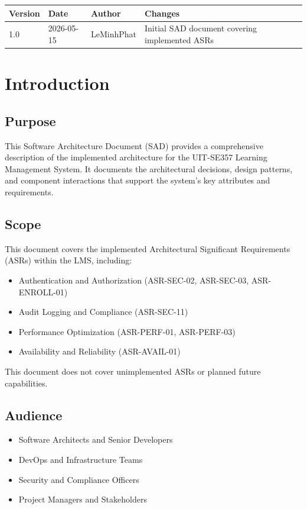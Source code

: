 \documentclass[12pt,oneside,a4paper]{article}
\begin{document}
\begin{tabularx}{\textwidth}{|p{1.5cm}|p{2cm}|p{3cm}|X|}
    \hline
    \textbf{Version} & \textbf{Date} & \textbf{Author} & \textbf{Changes} \\
    \hline
    1.0 & 2026-05-15 & LeMinhPhat & Initial SAD document covering implemented ASRs \\
    \hline
\end{tabularx}

\newpage

\tableofcontents
\newpage

\section{Introduction}

\subsection{Purpose}
This Software Architecture Document (SAD) provides a comprehensive description of the implemented architecture for the UIT-SE357 Learning Management System. It documents the architectural decisions, design patterns, and component interactions that support the system's key attributes and requirements.

\subsection{Scope}
This document covers the implemented Architectural Significant Requirements (ASRs) within the LMS, including:
\begin{itemize}
    \item Authentication and Authorization (ASR-SEC-02, ASR-SEC-03, ASR-ENROLL-01)
    \item Audit Logging and Compliance (ASR-SEC-11)
    \item Performance Optimization (ASR-PERF-01, ASR-PERF-03)
    \item Availability and Reliability (ASR-AVAIL-01)
\end{itemize}

This document does not cover unimplemented ASRs or planned future capabilities.

\subsection{Audience}
\begin{itemize}
    \item Software Architects and Senior Developers
    \item DevOps and Infrastructure Teams
    \item Security and Compliance Officers
    \item Project Managers and Stakeholders
\end{itemize}
\end{document}
